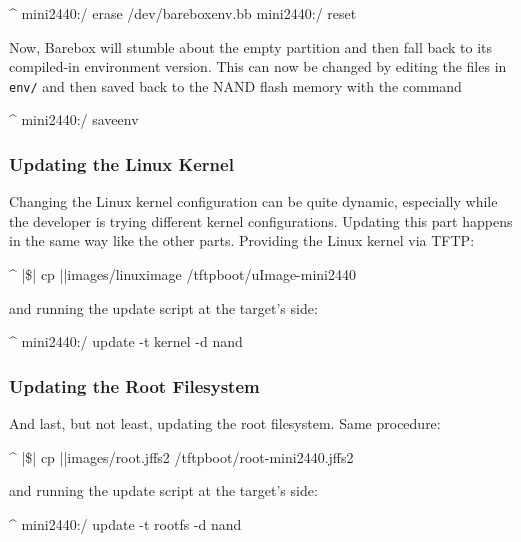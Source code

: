 \begin{ptxshell}[escapechar=|]{^}
mini2440:/ erase /dev/bareboxenv.bb
mini2440:/ reset
\end{ptxshell}

Now, Barebox will stumble about the empty partition and then fall back to its
compiled-in environment version. This can now be changed by editing the files
in \texttt{env/} and then saved back to the NAND flash memory with the command

\begin{ptxshell}[escapechar=|]{^}
mini2440:/ saveenv
\end{ptxshell}

\subsubsection{Updating the Linux Kernel}

Changing the Linux kernel configuration can be quite dynamic, especially while
the developer is trying different kernel configurations. Updating this part
happens in the same way like the other parts. Providing the Linux kernel via
TFTP:

\begin{ptxshell}[escapechar=|]{^}
|\$| cp |\ptxdistPlatformDir |images/linuximage /tftpboot/uImage-mini2440
\end{ptxshell}

and running the update script at the target's side:

\begin{ptxshell}[escapechar=|]{^}
mini2440:/ update -t kernel -d nand
\end{ptxshell}

\subsubsection{Updating the Root Filesystem}

And last, but not least, updating the root filesystem. Same procedure:

\begin{ptxshell}[escapechar=|]{^}
|\$| cp |\ptxdistPlatformDir |images/root.jffs2 /tftpboot/root-mini2440.jffs2
\end{ptxshell}

and running the update script at the target's side:

\begin{ptxshell}[escapechar=|]{^}
mini2440:/ update -t rootfs -d nand
\end{ptxshell}

